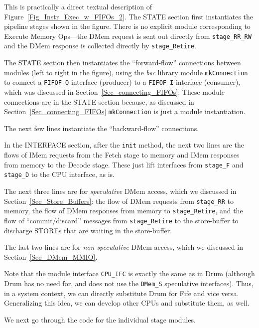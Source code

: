 
This is practically a direct textual description of
Figure~\ref{Fig_Instr_Exec_w_FIFOs_2}.  The STATE section first
instantiates the pipeline stages shown in the figure.  There is no
explicit module corresponding to Execute Memory Ops---the DMem request
is sent out directly from \verb|stage_RR_RW| and the DMem response is
collected directly by \verb|stage_Retire|.

The STATE section then instantiates the ``forward-flow'' connections
between modules (left to right in the figure), using the \emph{bsc}
library module \verb|mkConnection| to connect a \verb|FIFOF_O|
interface (producer) to a \verb|FIFOF_I| interface (consumer), which
was discussed in Section~\ref{Sec_connecting_FIFOs}.  These module
connections are in the STATE section because, as discussed in
Section~\ref{Sec_connecting_FIFOs} \verb|mkConnection| is just a
module instantiation.

The next few lines instantiate the ``backward-flow'' connections.

In the INTERFACE section, after the \verb|init| method, the next two
lines are the flows of IMem requests from the Fetch stage to memory
and IMem responses from memory to the Decode stage.  These just lift
interfaces from \verb|stage_F| and \verb|stage_D| to the CPU
interface, as is.

The next three lines are for \emph{speculative} DMem access, which we
discussed in Section~\ref{Sec_Store_Buffers}: the flow of DMem
requests from \verb|stage_RR| to memory, the flow of DMem responses
from memory to \verb|stage_Retire|, and the flow of ``commit/discard''
messages from \verb|stage_Retire| to the store-buffer to discharge
STOREs that are waiting in the store-buffer.

The last two lines are for \emph{non-speculative} DMem access, which
we discussed in Section~\ref{Sec_DMem_MMIO}.

Note that the module interface \verb|CPU_IFC| is exactly the same as
in Drum (although Drum has no need for, and does not use the
\verb|DMem_S| speculative interfaces).  Thus, in a system context, we
can directly substitute Drum for Fife and vice versa.  Generalizing
this idea, we can develop other CPUs and substitute them, as well.

We next go through the code for the individual stage modules.



